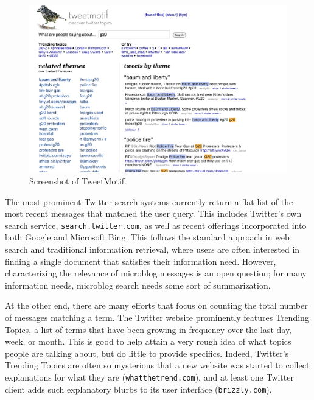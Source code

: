 \documentclass[letterpaper]{article}
\newcommand{\link}[1]{\texttt{\small{#1}}}
\begin{document}
\begin{figure}[htbp]
\begin{center}
\includegraphics[scale=0.3]{screenshot.png}
\caption{Screenshot of TweetMotif.}
\label{screenshot}
\end{center}
\end{figure}


The most prominent Twitter search systems currently return a flat list of the most recent messages that matched the user query.  This includes Twitter's own search service, \link{search.twitter.com}, as well as recent offerings incorporated into both Google and Microsoft Bing.  This follows the standard approach in web search and traditional information retrieval, where users are often interested in finding a single document that satisfies their information need.  However, characterizing the relevance of microblog messages is an open question; for many information needs, microblog search needs some sort of summarization.

At the other end, there are many efforts that focus on counting the total number of messages matching a term.  The Twitter website prominently features Trending Topics, a list of terms that have been growing in frequency over the last day, week, or month.
This is good to help attain a very rough idea of what topics people are talking about, but do little to provide specifics.  Indeed, Twitter's Trending Topics are often so mysterious that a new website was started to collect explanations for what they are (\link{whatthetrend.com}), and at least one Twitter client adds such explanatory blurbs to its user interface (\link{brizzly.com}).
\end{document}
